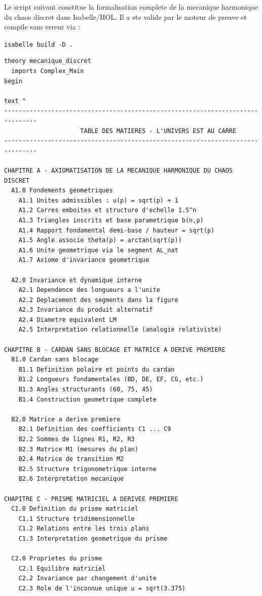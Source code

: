 \documentclass[12pt,a4paper]{article}
\theoremstyle{definition}
\theoremstyle{remark}
\begin{document}
Le script suivant constitue la formalisation complete de la mecanique
harmonique du chaos discret dans Isabelle/HOL. Il a ete valide par le
moteur de preuve et compile sans erreur via :

\texttt{isabelle build -D .}

\begin{verbatim}
theory mecanique_discret
  imports Complex_Main
begin

text "
-------------------------------------------------------------------------------
                     TABLE DES MATIERES - L'UNIVERS EST AU CARRE
-------------------------------------------------------------------------------

CHAPITRE A - AXIOMATISATION DE LA MECANIQUE HARMONIQUE DU CHAOS DISCRET
  A1.0 Fondements geometriques
    A1.1 Unites admissibles : u(p) = sqrt(p) + 1
    A1.2 Carres emboites et structure d'echelle 1.5^n
    A1.3 Triangles inscrits et base parametrique b(n,p)
    A1.4 Rapport fondamental demi-base / hauteur = sqrt(p)
    A1.5 Angle associe theta(p) = arctan(sqrt(p))
    A1.6 Unite geometrique via le segment AL_nat
    A1.7 Axiome d'invariance geometrique

  A2.0 Invariance et dynamique interne
    A2.1 Dependence des longueurs a l'unite
    A2.2 Deplacement des segments dans la figure
    A2.3 Invariance du produit alternatif
    A2.4 Diametre equivalent LM
    A2.5 Interpretation relationnelle (analogie relativiste)

CHAPITRE B - CARDAN SANS BLOCAGE ET MATRICE A DERIVE PREMIERE
  B1.0 Cardan sans blocage
    B1.1 Definition polaire et points du cardan
    B1.2 Longueurs fondamentales (BD, DE, EF, CG, etc.)
    B1.3 Angles structurants (60, 75, 45)
    B1.4 Construction geometrique complete

  B2.0 Matrice a derive premiere
    B2.1 Definition des coefficients C1 ... C9
    B2.2 Sommes de lignes R1, R2, R3
    B2.3 Matrice M1 (mesures du plan)
    B2.4 Matrice de transition M2
    B2.5 Structure trigonometrique interne
    B2.6 Interpretation mecanique

CHAPITRE C - PRISME MATRICIEL A DERIVEE PREMIERE
  C1.0 Definition du prisme matriciel
    C1.1 Structure tridimensionnelle
    C1.2 Relations entre les trois plans
    C1.3 Interpretation geometrique du prisme

  C2.0 Proprietes du prisme
    C2.1 Equilibre matriciel
    C2.2 Invariance par changement d'unite
    C2.3 Role de l'inconnue unique u = sqrt(3.375)


\end{verbatim}
\end{document}
